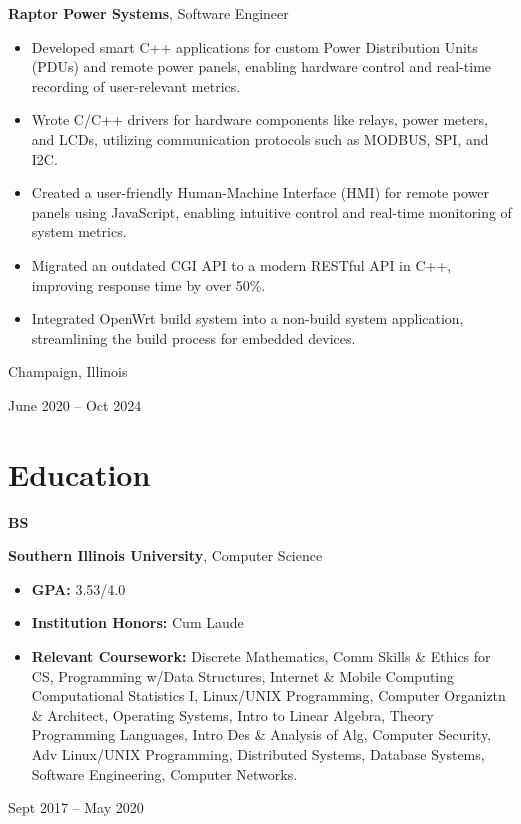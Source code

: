 \documentclass[10pt, letterpaper]{article}
\newenvironment{highlights}{
    \begin{itemize}[
        topsep=0.10 cm,
        parsep=0.10 cm,
        partopsep=0pt,
        itemsep=0pt,
        leftmargin=0.4 cm + 10pt
    ]
}{
    \end{itemize}
} %
\newenvironment{twocolentry}[2][]{
    \onecolentry
    \def\secondColumn{#2}
    \setcolumnwidth{\fill, 4.5 cm}
    \begin{paracol}{2}
}{
    \switchcolumn \raggedleft \secondColumn
    \end{paracol}
    \endonecolentry
} %
\newenvironment{threecolentry}[3][]{
    \onecolentry
    \def\thirdColumn{#3}
    \setcolumnwidth{1 cm, \fill, 4.5 cm}
    \begin{paracol}{3}
    {\raggedright #2} \switchcolumn
}{
    \switchcolumn \raggedleft \thirdColumn
    \end{paracol}
    \endonecolentry
} %
\begin{document}
        
        \begin{twocolentry}{
            Champaign, Illinois

        June 2020 – Oct 2024
        }
            \textbf{Raptor Power Systems}, Software Engineer
            \begin{highlights}
                \item Developed smart C++ applications for custom Power Distribution Units (PDUs) and remote power panels, enabling hardware control and real-time recording of user-relevant metrics.
                \item Wrote C/C++ drivers for hardware components like relays, power meters, and LCDs, utilizing communication protocols such as MODBUS, SPI, and I2C.
                \item Created a user-friendly Human-Machine Interface (HMI) for remote power panels using JavaScript, enabling intuitive control and real-time monitoring of system metrics.
                \item Migrated an outdated CGI API to a modern RESTful API in C++, improving response time by over 50\%.
                \item Integrated OpenWrt build system into a non-build system application, streamlining the build process for embedded devices.
            \end{highlights}
        \end{twocolentry}



    
    \section{Education}



        
        \begin{threecolentry}{\textbf{BS}}{
            Sept 2017 – May 2020
        }
            \textbf{Southern Illinois University}, Computer Science
            \begin{highlights}
                \item \textbf{GPA:} 3.53/4.0
                \item \textbf{Institution Honors:} Cum Laude
                \item \textbf{Relevant Coursework:} Discrete Mathematics, Comm Skills \& Ethics for CS, Programming w/Data Structures, Internet \& Mobile Computing Computational Statistics I, Linux/UNIX Programming, Computer Organiztn \& Architect, Operating Systems, Intro to Linear Algebra, Theory Programming Languages, Intro Des \& Analysis of Alg, Computer Security, Adv Linux/UNIX Programming, Distributed Systems, Database Systems, Software Engineering, Computer Networks.
            \end{highlights}
        \end{threecolentry}
\end{document}
